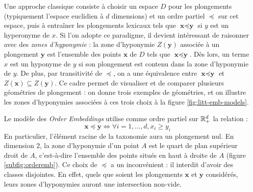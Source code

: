 Une approche classique consiste à choisir un espace $D$ pour les plongements (typiquement l'espace euclidien à $d$ dimensions) et un ordre partiel $\preceq$ sur cet espace, puis à entraîner les plongements lexicaux tels que $\textbf{x} \preceq \textbf{y}$ si $y$ est un hyperonyme de $x$.
Si l'on adopte ce paradigme, il devient intéressant de raisonner avec des \textit{zones d'hyponymie} : la zone d'hyponymie $Z(\textbf{y})$ associée à un plongement $\textbf{y}$ est l'ensemble des points $\textbf{x}$ de $D$ tels que $\textbf{x} \preceq \textbf{y}$. Dès lors, un terme $x$ est un hyponyme de $y$ si son plongement est contenu dans la zone d'hyponymie de $y$. De plus, par transitivité de $\preceq$, on a une équivalence entre $\textbf{x} \preceq \textbf{y}$ et $Z(\textbf{x}) \subseteq Z(\textbf{y})$. Ce cadre permet de visualiser et de comparer plusieurs géométries de plongement : on donne trois exemples de géométries, et on illustre les zones d'hyponymies associées à ces trois choix à la figure \ref{fig:litt-emb-models}.

Le modèle des \textit{Order Embeddings}\cite{vendrov2015order} utilise comme ordre partiel sur $\mathbb{R}^d_+$ la relation :
\begin{equation}
    \textbf{x} \preceq \textbf{y} \iff \forall i = 1, \ldots, d, {} x_i \geq y_i
\end{equation}
En particulier, l'élément racine de la taxonomie aura un plongement nul. %
En dimension 2, la zone d'hyponymie d'un point $A$ est le quart de plan supérieur droit de $A$, c'est-à-dire l'ensemble des points situés en haut à droite de $A$ (figure \ref{subfig:orderemb}). Ce choix de $\preceq$ a un inconvénient : il interdit d'avoir des classes disjointes. En effet, quels que soient les plongements $\textbf{x}$ et $\textbf{y}$ considérés, leurs zones d'hyponymies auront une intersection non-vide.

